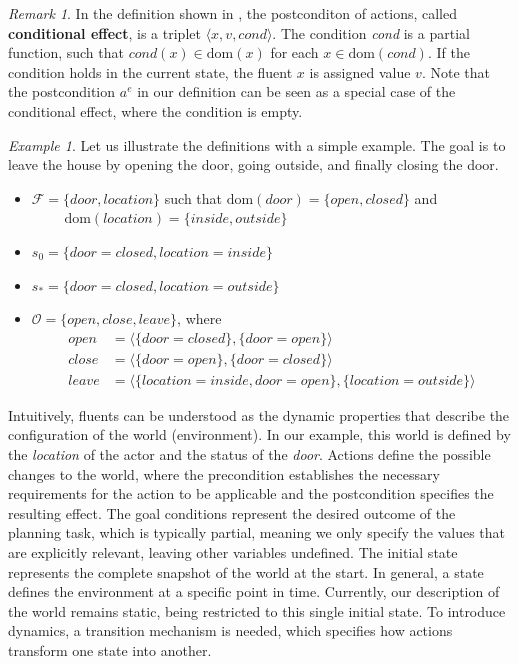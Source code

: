 \documentclass[
     11pt,                    %
     a4paper,             %
     BCOR=10mm,     %
     DIV=14,                 %
     listof=totoc,                    %
     bibliography=totoc,       %
     index=totoc,              %
     parskip            %
     twoside,
     headsepline
     ]{scrreprt}
\theoremstyle{definition}
\theoremstyle{definition}
\theoremstyle{remark}
\newtheorem{example}{\textit{Example}}
\newtheorem*{remark}{Remark}
\theoremstyle{bfnote}
\newcommand{\dom}{\mathrm{dom}}
\begin{document}
\begin{remark}
  In the definition shown in \textcite{Helmert_2006}, the postconditon of actions, called \textbf{conditional effect}, is a triplet $\langle x, v, cond \rangle$. The condition \textit{cond} is a partial function, such that $cond(x) \in \dom(x)$ for each $x \in \dom(cond)$. If the condition holds in the current state, the fluent $x$ is assigned value $v$. 
  Note that the postcondition $a^e$ in our definition can be seen as a special case of the conditional effect, where the condition is empty.
\end{remark}

\begin{example}
  Let us illustrate the definitions with a simple example. The goal is to leave the house by opening the door, going outside, and finally closing the door.
  \begin{itemize}
    \item $\mathcal{F} = \{door, location\}$ such that $\dom(door) = \{open, closed\}$ and \\ $\quad \quad$ \mbox{$\dom(location) = \{inside, outside\}$}
    \item $s_0 = \{door{=}closed, location{=}inside\}$
    \item $s_* = \{door{=}closed, location{=}outside\}$
    \item $\mathcal{O} = \{open, close, leave\}$, where
    \vspace{-1em}
    \begin{align*}
      open &= \langle\{door{=}closed\}, \{door{=}open\}\rangle\\
      close &= \langle\{door{=}open\}, \{door{=}closed\}\rangle\\
      leave &= \langle\{location{=}inside, door{=}open\}, \{location{=}outside\}\rangle
    \end{align*}
  \end{itemize}
\end{example}

Intuitively, fluents can be understood as the dynamic properties that describe the configuration of the world (environment). In our example, this world is defined by the \textit{location} of the actor and the status of the \textit{door}.
Actions define the possible changes to the world, where the precondition establishes the necessary requirements for the action to be applicable and the postcondition specifies the resulting effect.
The goal conditions represent the desired outcome of the planning task, which is typically partial, meaning we only specify the values that are explicitly relevant, leaving other variables undefined.
The initial state represents the complete snapshot of the world at the start. In general, a state defines the environment at a specific point in time. Currently, our description of the world remains static, being restricted to this single initial state. To introduce dynamics, a transition mechanism is needed, which specifies how actions transform one state into another.
\end{document}
